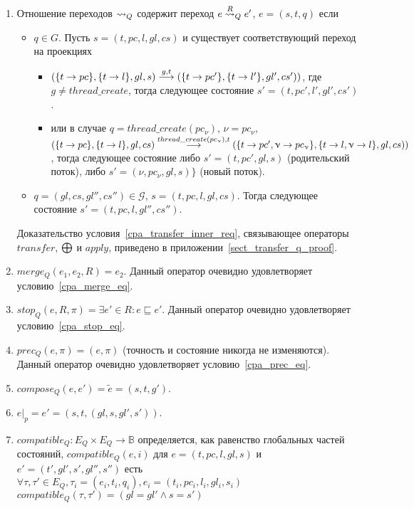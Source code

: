 \begin{enumerate}
\item
Отношение переходов $\leadsto_Q$ содержит переход $e \stackrel{R}{\leadsto}_Q e'$, $e=(s, t, q)$ если
\begin{itemize}
\item $q \in G$. Пусть $s=(t, pc, l, gl, cs)$ и существует соответствующий переход на проекциях
\begin{itemize}
\item $(\{t\to pc\}, \{t\to l\}, gl, s) \stackrel{g,t}{\longrightarrow} (\{t\to pc'\}, \{t\to l'\}, gl', cs'))$, где $g \ne thread\_create$, тогда 
следующее состояние $s' = (t,pc',l', gl',cs')$.
\item или в случае $q=thread\_create(pc_\nu)$, $\nu=pc_\nu$, \\
$(\{t\to pc\}, \{t\to l\}, gl, cs) \stackrel{thread\_create(pc_\upnu), t}{\longrightarrow} (\{t\to pc', \upnu \to pc_\upnu\}, \{t\to l,\upnu \to l\}, gl, cs))$, тогда 
следующее состояние либо $s' = (t,pc',gl,s)$ (родительский поток), либо $s' = (\nu,pc_\nu,gl,s)\}$ (новый поток).
\end{itemize}
\item $q=(gl, cs, gl'',cs'') \in \mathcal{G}$, $s=(t, pc, l, gl, cs)$. Тогда следующее состояние $s'=(t, pc, l, gl'', cs'')$.
\end{itemize}

Доказательство условия~\ref{cpa_transfer_inner_req}, связывающее операторы $transfer$, $\mathrel{\bigoplus}$ и $apply$, приведено в приложении~\ref{sect_transfer_q_proof}.

\item
$merge_Q(e_1,e_2,R) = e_2$.
Данный оператор очевидно удовлетворяет условию~\ref{cpa_merge_eq}.

\item
$stop_Q(e,R,\pi)=\exists e' \in R: e \sqsubseteq e'$.
Данный оператор очевидно удовлетворяет условию~\ref{cpa_stop_eq}.

\item
$prec_Q(e,\pi)=(e,\pi)$ (точность и состояние никогда не изменяются).
Данный оператор очевидно удовлетворяет условию~\ref{cpa_prec_eq}.

\item 
$compose_Q(e,e')=\tilde{e} = (s, t, g')$.

\item 
$e|_p = e' = (s, t, (gl, s, gl', s'))$.

\item
$compatible_Q: E_Q \times E_Q \to \mathbb{B}$ определяется, как равенство глобальных частей состояний, $compatible_Q(e,i)$ для $e=(t,pc, l, gl,s)$ и $e'=(t',gl',s',gl'',s'')$ есть    
$\forall \tau, \tau' \in E_Q, \tau_i = (e_i, t_i, q_i), e_i=(t_i,pc_i, l_i, gl_i,s_i)$ \\
$compatible_Q(\tau, \tau') = (gl=gl' \land s=s')$

\end{enumerate}

